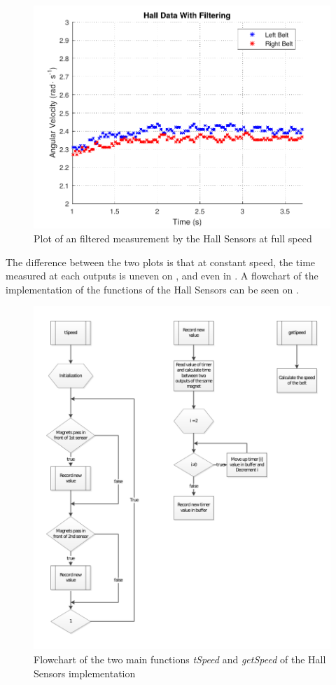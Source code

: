\begin{figure}[H]
	\centering
	\includegraphics[scale=0.9]{figures/filteredHall.pdf}
	\caption{Plot of an filtered measurement by the Hall Sensors at full speed}
	\label{filteredHall}
\end{figure}

The difference between the two plots is that at constant speed, the time measured at each outputs is uneven on , and even in . A flowchart of the implementation of the functions of the Hall Sensors can be seen on .

\begin{figure}[H]
	\centering
	\includegraphics[scale=0.9]{figures/hallFlowchart.pdf}
	\caption{Flowchart of the two main functions \textit{tSpeed} and \textit{getSpeed} of the Hall Sensors implementation}
	\label{hallFlowchart}
\end{figure}

